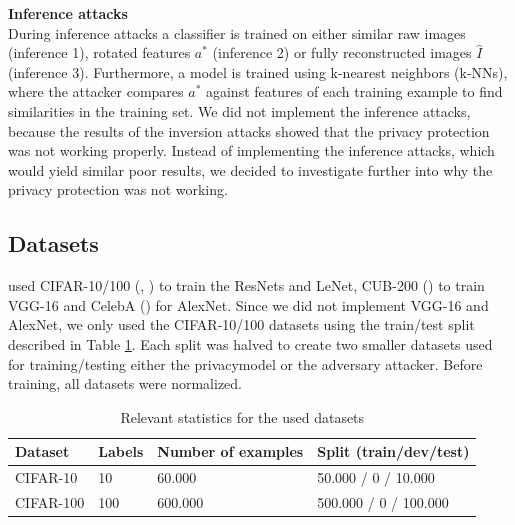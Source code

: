 

\textbf{Inference attacks}\\
During inference attacks a classifier is trained on either similar raw images (inference 1), rotated features $a^*$ (inference 2) or fully reconstructed images $\hat{I}$ (inference 3). Furthermore, a model is trained using k-nearest neighbors (k-NNs), where the attacker compares $a^*$ against features of each training example to find similarities in the training set. We did not implement the inference attacks, because the results of the inversion attacks showed that the privacy protection was not working properly. Instead of implementing the inference attacks, which would yield similar poor results, we decided to investigate further into why the privacy protection was not working.


\subsection{Datasets}

\citet{xiang2020interpretable} used CIFAR-10/100 (\citet{cifar10}, \citet{cifar100}) to train the ResNets and LeNet, CUB-200 (\citet{WelinderEtal2010}) to train VGG-16 and CelebA (\citet{CelebA}) for AlexNet. Since we did not implement VGG-16 and AlexNet, we only used the CIFAR-10/100 datasets using the train/test split described in Table \ref{dataset}. Each split was halved to create two smaller datasets used for training/testing either the privacymodel or the adversary attacker. Before training, all datasets were normalized. 

\begin{table}[t]
    \centering
    \setlength{\abovecaptionskip}{5pt}
    \caption{Relevant statistics for the used datasets}
    \begin{tabular}{l||l|l|l}
    \hline
    \textbf{Dataset} & \textbf{Labels} & \textbf{Number of examples} & \textbf{Split (train/dev/test)} \\
    \hline 
    CIFAR-10 & 10 & 60.000 & 50.000 / 0 / 10.000 \\
    CIFAR-100 & 100 & 600.000 & 500.000 / 0 / 100.000 \\
    \end{tabular}
    \label{dataset}
\end{table}

